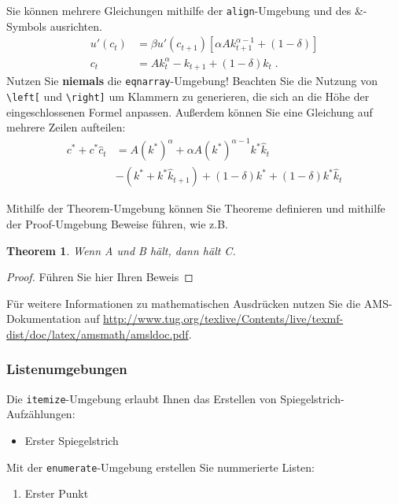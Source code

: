 \documentclass[a4paper,12pt]{scrartcl} %
\newtheorem{theorem}{Theorem} %
\begin{document}
Sie können mehrere Gleichungen mithilfe der \texttt{align}-Umgebung und des \&-Symbols ausrichten.
\begin{align}
	u'(c_t)&= \beta u'(c_{t+1}) \left[\alpha A k_{t+1}^{\alpha-1} +(1-\delta)\right] \label{euler}\\
    c_t &=Ak_t^{\alpha} - k_{t+1} + (1-\delta)k_t \;.\label{ressource}
\end{align}
Nutzen Sie \textbf{niemals} die \texttt{eqnarray}-Umgebung! Beachten Sie die Nutzung von \verb|\left[| und \verb|\right]| um Klammern zu generieren, die sich an die Höhe der eingeschlossenen Formel anpassen. Außerdem können Sie eine Gleichung auf mehrere Zeilen aufteilen:
\begin{equation}
	\begin{split}
        c^* + c^* \hat{c}_{t} &= A\left(k^*\right)^{\alpha} + \alpha A \left(k^*\right)^{\alpha-1} k^* \hat{k}_t \\
                              &- \left( k^* + k^* \hat{k}_{t+1}\right) + (1-\delta)k^* + (1-\delta) k^* \hat{k}_t
    \end{split}
\end{equation}

Mithilfe der Theorem-Umgebung können Sie Theoreme definieren und mithilfe der Proof-Umgebung Beweise führen, wie z.B.\
\begin{theorem}
Wenn A und B hält, dann hält C.
\end{theorem}

\begin{proof}
Führen Sie hier Ihren Beweis
\end{proof}

Für weitere Informationen zu mathematischen Ausdrücken nutzen Sie die AMS-Dokumentation auf \url{http://www.tug.org/texlive/Contents/live/texmf-dist/doc/latex/amsmath/amsldoc.pdf}.

\subsubsection*{Listenumgebungen}

Die \texttt{itemize}-Umgebung erlaubt Ihnen das Erstellen von Spiegelstrich-Aufzählungen:

\begin{itemize}
  \item Erster Spiegelstrich
\end{itemize}
Mit der \texttt{enumerate}-Umgebung erstellen Sie nummerierte Listen:
\begin{enumerate}
  \item Erster Punkt
\end{enumerate}
\end{document}
